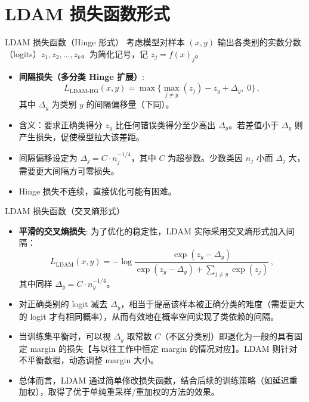 \documentclass{beamer}
\begin{document}
\section{LDAM 损失函数形式}
\begin{frame}{LDAM 损失函数（Hinge 形式）}
    考虑模型对样本 $(x,y)$ 输出各类别的实数分数（logits）$z_1, z_2, \dots, z_k$。为简化记号，记 $z_j = f(x)_j$。
    \begin{itemize}
        \item \textbf{间隔损失（多分类 Hinge 扩展）}: 
        \[
            L_{\text{LDAM-HG}}(x,y) = \max\{\max_{j \neq y}(z_j) - z_y + \Delta_y,\;0\}\,,
        \] 
        其中 $\Delta_y$ 为类别 $y$ 的间隔偏移量（下同）。
        \item 含义：要求正确类得分 $z_y$ 比任何错误类得分至少高出 $\Delta_y$。若差值小于 $\Delta_y$ 则产生损失，促使模型拉大该差距。
        \item 间隔偏移设定为 $\displaystyle \Delta_j = C \cdot n_j^{-1/4}$，其中 $C$ 为超参数。少数类因 $n_j$ 小而 $\Delta_j$ 大，需要更大间隔方可零损失。
        \item Hinge 损失不连续，直接优化可能有困难。
    \end{itemize}
\end{frame}

\begin{frame}{LDAM 损失函数（交叉熵形式）}
    \begin{itemize}
        \item \textbf{平滑的交叉熵损失}: 为了优化的稳定性，LDAM 实际采用交叉熵形式加入间隔：
        \[
            L_{\text{LDAM}}(x,y) = -\log \frac{\exp(z_y - \Delta_y)}{\exp(z_y - \Delta_y) + \sum_{j \neq y}\exp(z_j)}\,,
        \] 
        其中同样 $\Delta_y = C \cdot n_y^{-1/4}$。
        \item 对正确类别的 logit 减去 $\Delta_y$，相当于提高该样本被正确分类的难度（需要更大的 logit 才有相同概率），从而有效地在概率空间实现了类依赖的间隔。
        \item 当训练集平衡时，可以视 $\Delta_y$ 取常数 $C$（不区分类别）即退化为一般的具有固定 margin 的损失【与以往工作中恒定 margin 的情况对应】。LDAM 则针对不平衡数据，动态调整 margin 大小。
        \item 总体而言，LDAM 通过简单修改损失函数，结合后续的训练策略（如延迟重加权），取得了优于单纯重采样/重加权的方法的效果。
    \end{itemize}
\end{frame}
\end{document}
